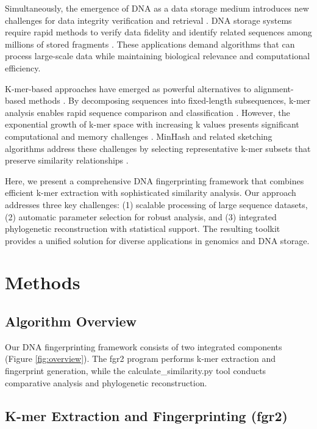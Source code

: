 \documentclass[12pt,a4paper]{article}
\begin{document}
Simultaneously, the emergence of DNA as a data storage medium introduces new challenges for data integrity verification and retrieval \citep{church2012next}. DNA storage systems require rapid methods to verify data fidelity and identify related sequences among millions of stored fragments \citep{organick2018random}. These applications demand algorithms that can process large-scale data while maintaining biological relevance and computational efficiency.

K-mer-based approaches have emerged as powerful alternatives to alignment-based methods \citep{marcais2011fast}. By decomposing sequences into fixed-length subsequences, k-mer analysis enables rapid sequence comparison and classification \citep{wood2014kraken}. However, the exponential growth of k-mer space with increasing k values presents significant computational and memory challenges \citep{rizk2013dsk}. MinHash and related sketching algorithms address these challenges by selecting representative k-mer subsets that preserve similarity relationships \citep{ondov2016mash}.

Here, we present a comprehensive DNA fingerprinting framework that combines efficient k-mer extraction with sophisticated similarity analysis. Our approach addresses three key challenges: (1) scalable processing of large sequence datasets, (2) automatic parameter selection for robust analysis, and (3) integrated phylogenetic reconstruction with statistical support. The resulting toolkit provides a unified solution for diverse applications in genomics and DNA storage.

\section{Methods}

\subsection{Algorithm Overview}

Our DNA fingerprinting framework consists of two integrated components (Figure \ref{fig:overview}). The fgr2 program performs k-mer extraction and fingerprint generation, while the calculate\_similarity.py tool conducts comparative analysis and phylogenetic reconstruction.

\subsection{K-mer Extraction and Fingerprinting (fgr2)}
\end{document}

